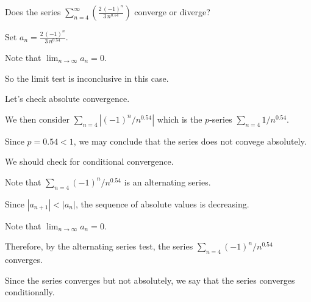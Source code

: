 \documentclass{ximera}
\begin{document}
\begin{question}
  Does the series \(\displaystyle\sum_{n=4}^\infty \left( \displaystyle\frac{2 \, \left(-1\right)^{n}}{3 \, n^{0.54}} \right)\) converge or diverge?

  \begin{solution}
    \begin{hint}
      Set \(a_{n} = \displaystyle\frac{2 \, \left(-1\right)^{n}}{3 \, n^{0.54}}\).
    \end{hint}
    \begin{hint}
      Note that \(\lim_{n \to \infty} a_n = 0\).
    \end{hint}
    \begin{hint}
      So the limit test is inconclusive in this case.
    \end{hint}
    \begin{hint}
      Let's check absolute convergence.
    \end{hint}
    \begin{hint}
      We then consider \(\displaystyle\sum_{n = 4} \left| (-1)^n/n^{0.54} \right|\) which is the \(p\)-series \(\displaystyle\sum_{n = 4} 1/n^{0.54}\).
    \end{hint}
    \begin{hint}
      Since \(p = 0.54 < 1\), we may conclude that the series does not convege absolutely.
    \end{hint}
    \begin{hint}
      We should check for conditional convergence.
    \end{hint}
    \begin{hint}
      Note that \(\displaystyle\sum_{n = 4} (-1)^n/n^{0.54} \) is an alternating series.
    \end{hint}
    \begin{hint}
      Since \(|a_{n+1}| < |a_{n}|\), the sequence of absolute values is decreasing.
    \end{hint}
    \begin{hint}
      Note that \(\lim_{n\to\infty} a_n = 0\).
    \end{hint}
    \begin{hint}
      Therefore, by the alternating series test, the series \(\displaystyle\sum_{n = 4} (-1)^n/n^{0.54} \) converges.
    \end{hint}
    \begin{hint}
      Since the series converges but not absolutely, we say that the series converges conditionally.
    \end{hint}
    
    
    \begin{multiple-choice}
      
    \end{multiple-choice}
    
  \end{solution}
\end{question}
\end{document}
